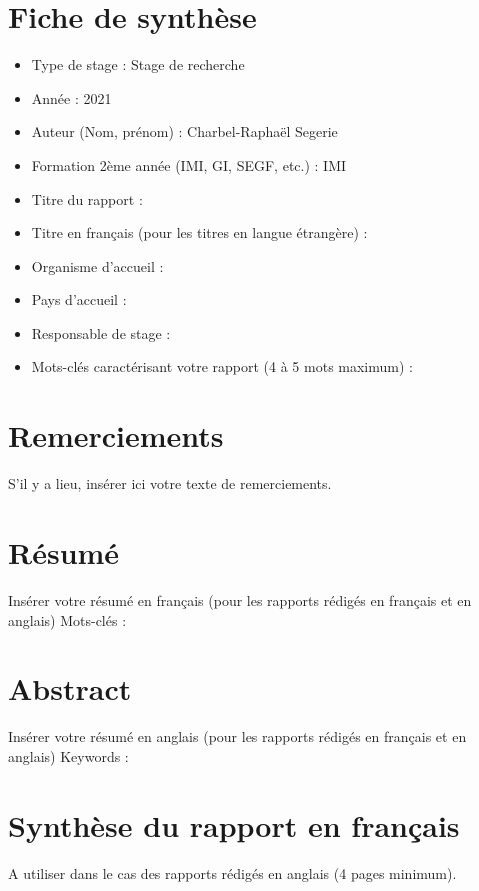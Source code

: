 \chapter*{\centering Fiche de synthèse}
\begin{itemize}
    \item Type de stage : Stage de recherche
    \item Année : 2021
    \item Auteur (Nom, prénom) : Charbel-Raphaël Segerie
    \item Formation 2ème année (IMI, GI, SEGF, etc.) : IMI
    \item Titre du rapport : 
    \item Titre en français (pour les titres en langue étrangère) :
    \item Organisme d’accueil :
    \item Pays d’accueil :
    \item Responsable de stage :
    \item Mots-clés caractérisant votre rapport (4 à 5 mots maximum) :
\end{itemize}

\chapter*{\centering Remerciements}

S'il y a lieu, insérer ici votre texte de remerciements.


\chapter*{\centering Résumé}

Insérer votre résumé en français (pour les rapports rédigés en français et en anglais)
Mots-clés :

\chapter*{\centering Abstract}

Insérer votre résumé en anglais (pour les rapports rédigés en français et en anglais)
Keywords :

\chapter*{\centering Synthèse du rapport en français}

A utiliser dans le cas des rapports rédigés en anglais (4 pages minimum).
